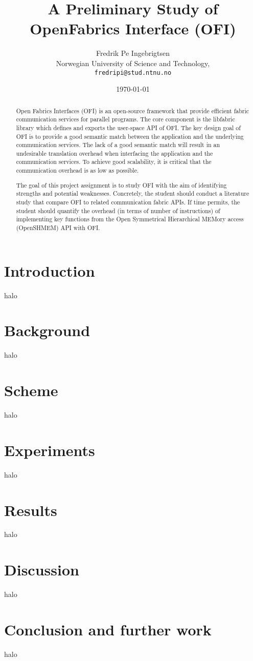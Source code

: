 \documentclass[twocolumn]{article}
\begin{document}
\title{A Preliminary Study of OpenFabrics Interface (OFI)}
\author{Fredrik Pe Ingebrigtsen\\
  Norwegian University of Science and Technology,\\
  \texttt{fredripi@stud.ntnu.no}}
\date{\today}
\maketitle




\begin{abstract}
Open Fabrics Interfaces (OFI) is an open-source framework that provide efficient fabric communication services for parallel programs. The core component is the libfabric library which defines and exports the user-space API of OFI. The key design goal of OFI is to provide a good semantic match between the application and the underlying communication services. The lack of a good semantic match will result in an undesirable translation overhead when interfacing the application and the communication services. To achieve good scalability, it is critical that the communication overhead is as low as possible.

The goal of this project assignment is to study OFI with the aim of identifying strengths and potential weaknesses. Concretely, the student should conduct a literature study that compare OFI to related communication fabric APIs. If time permits, the student should quantify the overhead (in terms of number of instructions) of implementing key functions from the Open Symmetrical Hierarchical MEMory access (OpenSHMEM) API with OFI.
\end{abstract}

\section{Introduction}
halo
\section{Background}
halo
\section{Scheme}
halo
\section{Experiments}
halo
\section{Results}
halo
\section{Discussion}
halo
\section{Conclusion and further work}
halo
\end{document}
